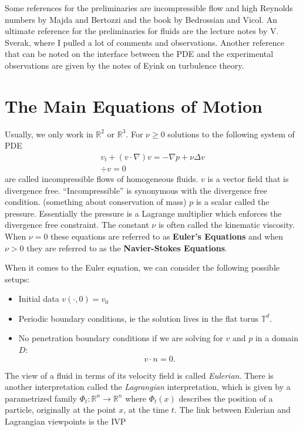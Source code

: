 Some references for the preliminaries are incompressible flow and high Reynolds numbers by Majda and Bertozzi and the book by Bedrossian and Vicol. An ultimate reference for the preliminaries for fluids are the lecture notes by V. Sverak, where I pulled a lot of comments and observations. Another reference that can be noted on the interface between the PDE and the experimental observations are given by the notes of Eyink on turbulence theory.


\section{The Main Equations of Motion}
Usually, we only work in $\mathbb{R}^2$ or $\mathbb{R}^3$. For $\nu \geq 0$ solutions to the following system of PDE
\begin{gather}
    v_t + (v \cdot \nabla)v = -\nabla p + \nu \Delta v\label{ns} \\
    \div v = 0
\end{gather}
are called incompressible flows of homogeneous fluids. $v$ is a vector field that is divergence free. ``Incompressible'' is synonymous with the divergence free condition. (something about conservation of mass) $p$ is a scalar called the pressure. Essentially the pressure is a Lagrange multiplier which enforces the divergence free constraint. The constant $\nu$ is often called the kinematic viscosity. When $\nu = 0$ these equations are referred to as \textbf{Euler's Equations} and when $\nu > 0$ they are referred to as the \textbf{Navier-Stokes Equations}.

When it comes to the Euler equation, we can consider the following possible setups:
\begin{itemize}
    \item Initial data $v(\cdot, 0) = v_0$
    \item Periodic boundary conditions, ie the solution lives in the flat torus $\mathbb{T}^d$.
    \item No penetration boundary conditions if we are solving for $v$ and $p$ in a domain $D$:
    \[v \cdot n = 0.\]
\end{itemize}

The view of a fluid in terms of its velocity field is called \textit{Eulerian}. There is another interpretation called the \textit{Lagrangian} interpretation, which is given by a parametrized family $\Phi_t: \mathbb{R}^n \to \mathbb{R}^n$ where $\Phi_t(x)$ describes the position of a particle, originally at the point $x$, at the time $t$. The link between Eulerian and Lagrangian viewpoints is the IVP

